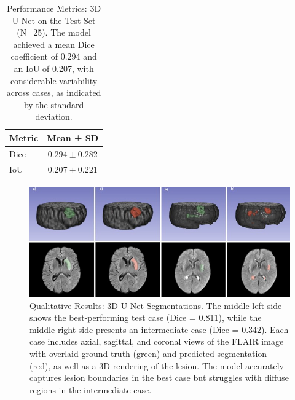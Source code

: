 \documentclass[12pt]{article}
\begin{document}
\begin{table}[tp]
\centering
\begin{tabular}{lc}
\toprule
\textbf{Metric} & \textbf{Mean ± SD} \\
\midrule
Dice & $0.294 \pm 0.282$ \\
IoU & $0.207 \pm 0.221$ \\
\bottomrule
\end{tabular}
\caption{Performance Metrics: 3D U-Net on the Test Set (N=25). The model achieved a mean Dice coefficient of 0.294 and an IoU of 0.207, with considerable variability across cases, as indicated by the standard deviation.}\label{tab:unet_metrics}
\end{table}


\begin{figure}[tp]
    \centering
    \includegraphics[width=\textwidth]{figures/Figure 2.jpg}
    \caption{Qualitative Results: 3D U-Net Segmentations. The middle-left side shows the best-performing test case (Dice = 0.811), while the middle-right side presents an intermediate case (Dice = 0.342). Each case includes axial, sagittal, and coronal views of the FLAIR image with overlaid ground truth (green) and predicted segmentation (red), as well as a 3D rendering of the lesion. The model accurately captures lesion boundaries in the best case but struggles with diffuse regions in the intermediate case.}
    \label{fig:unet_qualitative}
\end{figure}


\end{document}
